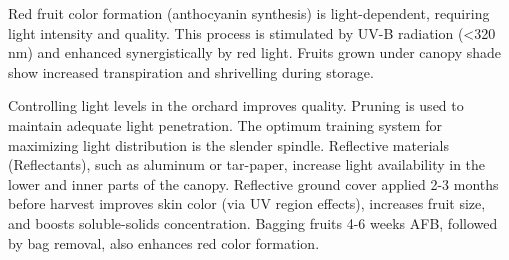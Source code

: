 \vspace{0.5em}
Red fruit color formation (anthocyanin synthesis) is light-dependent, requiring light intensity and quality. This process is stimulated by UV-B radiation (<320 nm) and enhanced synergistically by red light. Fruits grown under canopy shade show increased transpiration and shrivelling during storage.

\vspace{0.5em}
Controlling light levels in the orchard improves quality. Pruning is used to maintain adequate light penetration. The optimum training system for maximizing light distribution is the slender spindle. Reflective materials (Reflectants), such as aluminum or tar-paper, increase light availability in the lower and inner parts of the canopy. Reflective ground cover applied 2-3 months before harvest improves skin color (via UV region effects), increases fruit size, and boosts soluble-solids concentration. Bagging fruits 4-6 weeks AFB, followed by bag removal, also enhances red color formation.







